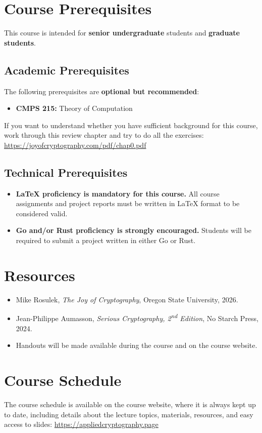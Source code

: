 \documentclass[10pt,a4paper,american]{exam}
\begin{document}
\section{Course Prerequisites}
This course is intended for \textbf{senior undergraduate} students and \textbf{graduate students}.

\subsection{Academic Prerequisites}
The following prerequisites are \textbf{optional but recommended}:

\begin{itemize}
	\item \textbf{CMPS 215:} Theory of Computation
\end{itemize}

If you want to understand whether you have sufficient background for this course, work through this review chapter and try to do all the exercises: \url{https://joyofcryptography.com/pdf/chap0.pdf}

\subsection{Technical Prerequisites}
\begin{itemize}
	\item \textbf{LaTeX proficiency is mandatory for this course.} All course assignments and project reports must be written in LaTeX format to be considered valid.
	\item \textbf{Go and/or Rust proficiency is strongly encouraged.} Students will be required to submit a project written in either Go or Rust.
\end{itemize}

\section{Resources}
\begin{itemize}
	\item Mike Rosulek, \textit{The Joy of Cryptography}, Oregon State University, 2026.
	\item Jean-Philippe Aumasson, \textit{Serious Cryptography, 2\textsuperscript{nd} Edition}, No Starch Press, 2024.
	\item Handouts will be made available during the course and on the course website.
\end{itemize}

\section{Course Schedule}
The course schedule is available on the course website, where it is always kept up to date, including details about the lecture topics, materials, resources, and easy access to slides: \url{https://appliedcryptography.page}
\end{document}
